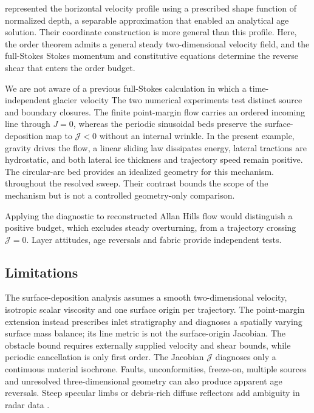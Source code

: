 \documentclass[review]{igs}
\providecommand{\DIFadd}[1]{{\protect\color{blue} \sf #1}} %
\providecommand{\DIFdel}[1]{{\protect\color{red} \scriptsize #1}} %
\providecommand{\DIFaddbegin}{} %
\providecommand{\DIFaddend}{} %
\providecommand{\DIFdelbegin}{} %
\providecommand{\DIFdelend}{} %
\newcommand{\DIFscaledelfig}{0.5}
\newlength{\DIFdelgraphicswidth} %
\newlength{\DIFdelgraphicsheight} %
\newcommand{\DIFaddincludegraphics}[2][]{{\color{blue}\fbox{\DIFOincludegraphics[#1]{#2}}}} %
\newcommand{\DIFdelincludegraphics}[2][]{%
\sbox{\DIFdelgraphicsbox}{\DIFOincludegraphics[#1]{#2}}%
\settoboxwidth{\DIFdelgraphicswidth}{\DIFdelgraphicsbox} %
\settoboxtotalheight{\DIFdelgraphicsheight}{\DIFdelgraphicsbox} %
\scalebox{\DIFscaledelfig}{%
\parbox[b]{\DIFdelgraphicswidth}{\usebox{\DIFdelgraphicsbox}\\[-\baselineskip] \rule{\DIFdelgraphicswidth}{0em}}\llap{\resizebox{\DIFdelgraphicswidth}{\DIFdelgraphicsheight}{%
\setlength{\unitlength}{\DIFdelgraphicswidth}%
\begin{picture}(1,1)%
\thicklines\linethickness{2pt} %
{\color[rgb]{1,0,0}\put(0,0){\framebox(1,1){}}}%
{\color[rgb]{1,0,0}\put(0,0){\line( 1,1){1}}}%
{\color[rgb]{1,0,0}\put(0,1){\line(1,-1){1}}}%
\end{picture}%
}\hspace*{3pt}}} %
} %
\DeclareRobustCommand{\DIFaddbegin}{\DIFOaddbegin \let\includegraphics\DIFaddincludegraphics} %
\DeclareRobustCommand{\DIFaddend}{\DIFOaddend \let\includegraphics\DIFOincludegraphics} %
\DeclareRobustCommand{\DIFdelbegin}{\DIFOdelbegin \let\includegraphics\DIFdelincludegraphics} %
\DeclareRobustCommand{\DIFdelend}{\DIFOaddend \let\includegraphics\DIFOincludegraphics} %
\begin{document}
\citet{ParreninHindmarshRemy2006} represented the horizontal velocity profile using a prescribed shape function of normalized depth, a separable approximation that enabled an analytical age solution. Their coordinate construction is more general than this profile. Here, the order theorem admits a general steady two-dimensional velocity field, and the \DIFdelbegin \DIFdel{full-Stokes }\DIFdelend \DIFaddbegin \DIFadd{Stokes }\DIFaddend momentum and constitutive equations determine the reverse shear that enters the order budget.

\DIFdelbegin \DIFdel{We are not aware of a previous full-Stokes calculation in which a time-independent glacier velocity }\DIFdelend \DIFaddbegin \DIFadd{The two numerical experiments test distinct source and boundary closures. The finite point-margin flow }\DIFaddend carries an ordered \DIFaddbegin \DIFadd{incoming line through \(J=0\), whereas the periodic sinusoidal beds preserve the }\DIFaddend surface-deposition map \DIFdelbegin \DIFdel{to \(\mathcal{J}<0\) without an internal wrinkle. In the present example, gravity drives the flow, a linear sliding law dissipates energy, lateral tractions are hydrostatic, and both lateral ice thickness and trajectory speed remain positive.
The circular-arc bed provides an idealized geometry for this mechanism.
}\DIFdelend \DIFaddbegin \DIFadd{throughout the resolved sweep. Their contrast bounds the scope of the mechanism but is not a controlled geometry-only comparison.
}\DIFaddend 

Applying the diagnostic to reconstructed Allan Hills flow would distinguish a positive budget, which excludes steady overturning, from a trajectory crossing \(\mathcal{J}=0\). Layer attitudes, age reversals and fabric provide independent tests.

\subsection{Limitations}

The \DIFaddbegin \DIFadd{surface-deposition }\DIFaddend analysis assumes a smooth two-dimensional velocity, isotropic scalar viscosity and one surface origin per trajectory. The \DIFaddbegin \DIFadd{point-margin extension instead prescribes inlet stratigraphy and diagnoses a spatially varying surface mass balance; its line metric is not the surface-origin Jacobian. The }\DIFaddend obstacle bound requires externally supplied velocity and shear bounds, while periodic cancellation is only first order. The Jacobian \(\mathcal{J}\) diagnoses only a continuous material isochrone. Faults, unconformities, freeze-on, multiple sources and unresolved three-dimensional geometry can also produce apparent age reversals. Steep specular limbs or debris-rich diffuse reflectors add ambiguity in radar data \citep{Holschuh2014,Holschuh2026}.
\end{document}
